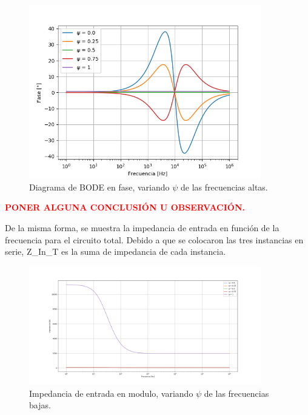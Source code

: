 \documentclass[a4paper]{article}
\begin{document}
\begin{figure}[H]
\centering
	\includegraphics[width=0.9\textwidth]{Imagenes/High-psi-ph.png}
	\caption{Diagrama de BODE en fase, variando $\psi$ de las frecuencias altas.}
	\label{fig:bode_ph_low}
\end{figure}

\begin{center}
\textcolor{red}{\textbf{PONER ALGUNA CONCLUSIÓN U OBSERVACIÓN.}}
\end{center}

De la misma forma, se muestra la impedancia de entrada en función de la frecuencia para el circuito total. Debido a que se colocaron las tres instancias en serie, Z_{In_{T}} es la suma de impedancia de cada instancia.

\begin{figure}[H]
\centering
	\includegraphics[width=0.9\textwidth]{Imagenes/Zin-Low-Mod.png}
	\caption{Impedancia de entrada en modulo, variando $\psi$ de las frecuencias bajas.}
	\label{fig:bode_modulo_low}
\end{figure}
\end{document}
